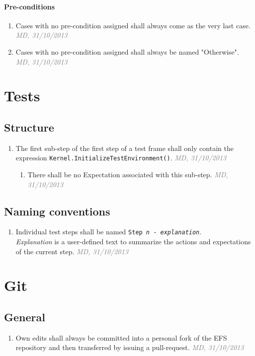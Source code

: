 \documentclass[a4paper, oneside]{scrreprt}
\let\emph\textsl
\newcommand{\code}[1]{\texttt{#1}}
\newcommand{\ruleauthor}[2]{\mbox{}\newline\mbox{}\hfill{\footnotesize\textcolor{gray}{\emph{#1, #2}}}\xspace}
\begin{document}
\subsubsection{Pre-conditions}
\begin{enumerate}
\item Cases with no pre-condition assigned shall always come as the very last case. \ruleauthor{MD}{31/10/2013}
\item Cases with no pre-condition assigned shall always be named "Otherwise". \ruleauthor{MD}{31/10/2013}
\end{enumerate}

\chapter{Tests}

\section{Structure}
\begin{enumerate}
\item The first sub-step of the first step of a test frame shall only contain the expression \code{Kernel.InitializeTestEnvironment()}. \ruleauthor{MD}{31/10/2013}
\begin{enumerate}
\item There shall be no Expectation associated with this sub-step. \ruleauthor{MD}{31/10/2013}
\end{enumerate}
\end{enumerate}

\section{Naming conventions}
\begin{enumerate}
\item Individual test steps shall be named \code{Step \emph{n} - \emph{explanation}}.\\ \emph{Explanation} is a user-defined text to summarize the actions and expectations of the current step. \ruleauthor{MD}{31/10/2013}
\end{enumerate}



\chapter{Git}
\section{General}
\begin{enumerate}
\item Own edits shall always be committed into a personal fork of the EFS repository and then transferred by issuing a pull-request. \ruleauthor{MD}{31/10/2013}
\end{enumerate}
\end{document}
